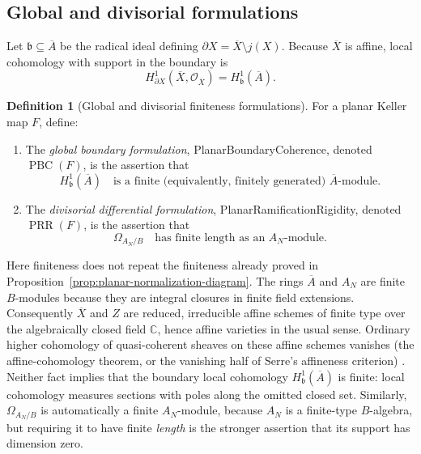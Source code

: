 \documentclass[11pt]{article}
\theoremstyle{remark}
\theoremstyle{definition}
\newtheorem{definition}[theorem]{Definition}
\newcommand{\C}{\mathbb C}
\begin{document}
\subsection{Global and divisorial formulations}
\label{sec:two-planar-finiteness-targets}

Let \(\mathfrak b\subseteq\overline A\) be the radical ideal defining
\(\partial X=\overline X\setminus j(X)\).  Because \(\overline X\) is
affine, local cohomology with support in the boundary is
\[
  H^1_{\partial X}(\overline X,\mathcal O_{\overline X})
  =H^1_{\mathfrak b}(\overline A).
\]

\begin{definition}[Global and divisorial finiteness formulations]
\label{def:two-planar-finiteness-targets}
For a planar Keller map \(F\), define:
\begin{enumerate}
  \item The \emph{global boundary formulation}, PlanarBoundaryCoherence,
  denoted
  \(\operatorname{PBC}(F)\), is the assertion that
  \[
    H^1_{\mathfrak b}(\overline A)
    \quad\text{is a finite (equivalently, finitely generated)
    \(\overline A\)-module}.
  \]
  \item The \emph{divisorial differential formulation},
  PlanarRamificationRigidity, denoted
  \(\operatorname{PRR}(F)\), is the assertion that
  \[
    \Omega_{A_N/B}
    \quad\text{has finite length as an \(A_N\)-module}.
  \]
\end{enumerate}
\end{definition}

Here finiteness does not repeat the finiteness already proved in
Proposition~\ref{prop:planar-normalization-diagram}.  The rings
\(\overline A\) and \(A_N\) are finite \(B\)-modules because they are
integral closures in finite field extensions.  Consequently
\(\overline X\) and \(Z\) are reduced, irreducible affine schemes of finite
type over the algebraically closed field \(\C\), hence affine varieties in
the usual sense.  Ordinary higher cohomology of quasi-coherent sheaves on
these affine schemes vanishes (the affine-cohomology theorem, or the
vanishing half of Serre's affineness criterion)
\cite{StacksAffineCohomology}.  Neither fact implies that
the boundary local cohomology \(H^1_{\mathfrak b}(\overline A)\) is finite:
local cohomology measures sections with poles along the omitted closed set.
Similarly, \(\Omega_{A_N/B}\) is automatically a finite \(A_N\)-module,
because \(A_N\) is a finite-type \(B\)-algebra, but requiring it to have
finite \emph{length} is the stronger assertion that its support has
dimension zero.
\end{document}
